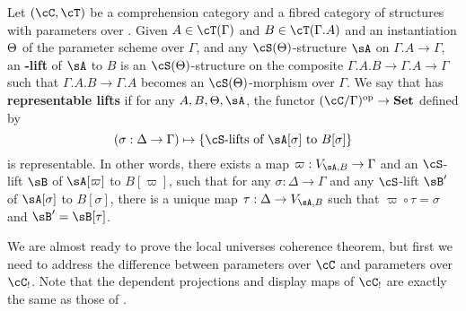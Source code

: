 \documentclass[referee]{psp}
\let\S\cS
\let\C\cC
\let\T\cT
\begin{document}
\begin{defn}\label{defn:replift-param}
  Let $(\C,\T)$ be a comprehension category and \S a fibred category of structures with parameters over \C.
  Given $A\in\T(\Gamma)$ and $B\in\T(\Gamma.A)$ and an instantiation $\Theta$ of the parameter scheme over $\Gamma$, and any $\S(\Th)$-structure $\sA$ on $\Gamma.A\to\Gamma$, an \textbf{\S-lift} of $\sA$ to $B$ is an $\S(\Th)$-structure on the composite $\Gamma.A.B\to\Gamma.A\to\Gamma$ such that $\Gamma.A.B\to\Gamma.A$ becomes an $\S(\Th)$-morphism over $\Gamma$.
  We say that \S has \textbf{representable lifts} if for any $A,B,\Th,\sA$, the functor $(\C/\Gamma)\op \to \mathbf{Set}$ defined by
  \begin{equation*}
    (\sigma:\Delta\to\Gamma) \mapsto \{ \S\text{-lifts of $\sA[\sigma]$ to $B[\sigma]$}\}
  \end{equation*}
  is representable.
  In other words, there exists a map $\varpi:V_{\sA,B}\to\Gamma$ and an $\S$-lift $\sB$ of $\sA[\varpi]$ to $B[\varpi]$, such that for any $\sigma:\Delta\to\Gamma$ and any $\S$-lift $\sB'$ of $\sA[\sigma]$ to $B[\sigma]$, there is a unique map $\tau:\Delta\to V_{\sA,B}$ such that $\varpi \circ \tau = \sigma$ and $\sB' = \sB[\tau]$.
\end{defn}

We are almost ready to prove the local universes coherence theorem, but first we need to address the difference between parameters over $\C$ and parameters over $\C_!$.
Note that the dependent projections and display maps of $\C_!$ are exactly the same as those of \C.
\end{document}
